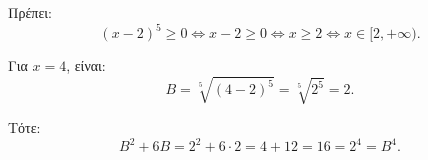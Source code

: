 
\begin{alist}
\item Πρέπει:
\[(x - 2)^5 \ge 0 \Leftrightarrow x - 2 \ge 0 \Leftrightarrow x \ge 2 \Leftrightarrow x \in [2, +\infty).\]

\item Για $x = 4$, είναι:
\[B = \sqrt[5]{(4 - 2)^5} = \sqrt[5]{2^5} = 2.\]

Τότε:
\[B^2 + 6B = 2^2 + 6 \cdot 2 = 4 + 12 = 16 = 2^4 = B^4.\]
\end{alist}


